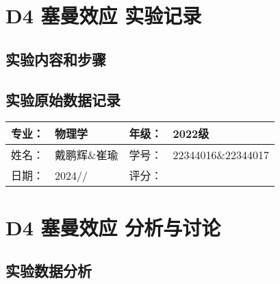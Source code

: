 \documentclass[dvipsnames, svgnames,a4paper,11pt]{article}
\begin{document}
\section{D4 \quad 塞曼效应 \quad\heiti 实验记录}
\subsection{实验内容和步骤}





\clearpage

\subsection{实验原始数据记录}








	





\clearpage
\begin{table}
	\renewcommand\arraystretch{1.7}
	\begin{tabularx}{\textwidth}{|X|X|X|X|}
	\hline
	专业：& 物理学 &年级：& 2022级\\
	\hline
	姓名： & 戴鹏辉\&崔瑜 & 学号：& 22344016\&22344017\\
	\hline
    日期：& 2024// & 评分： &\\
	\hline
	\end{tabularx}
\end{table}

\section{D4 \quad 塞曼效应 \quad\heiti 分析与讨论}

\subsection{实验数据分析}
\end{document}
